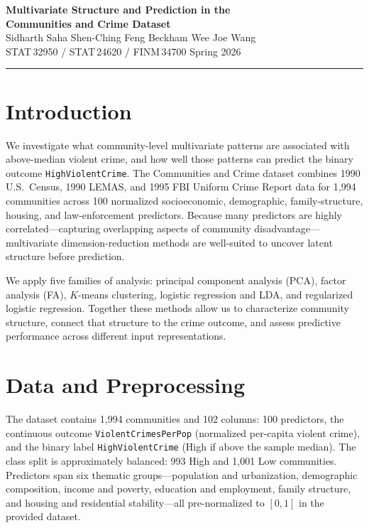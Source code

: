 \documentclass[11pt,letterpaper]{article}
\begin{document}
\begin{center}
  {\large\bfseries Multivariate Structure and Prediction in the\\[2pt]
   Communities and Crime Dataset}\\[8pt]
  Sidharth Saha \quad Shen-Ching Feng \quad Beckham Wee \quad Joe Wang\\[3pt]
  {\small STAT\,32950 / STAT\,24620 / FINM\,34700 \quad Spring 2026}
\end{center}
\vspace{2pt}\hrule\vspace{8pt}

\section{Introduction}

We investigate what community-level multivariate patterns are associated with above-median violent crime, and how well those patterns can predict the binary outcome \texttt{HighViolentCrime}. The Communities and Crime dataset combines 1990 U.S.\ Census, 1990 LEMAS, and 1995 FBI Uniform Crime Report data for 1{,}994 communities across 100 normalized socioeconomic, demographic, family-structure, housing, and law-enforcement predictors. Because many predictors are highly correlated—capturing overlapping aspects of community disadvantage—multivariate dimension-reduction methods are well-suited to uncover latent structure before prediction.

We apply five families of analysis: principal component analysis (PCA), factor analysis (FA), $K$-means clustering, logistic regression and LDA, and regularized logistic regression. Together these methods allow us to characterize community structure, connect that structure to the crime outcome, and assess predictive performance across different input representations.

\section{Data and Preprocessing}

The dataset contains 1{,}994 communities and 102 columns: 100 predictors, the continuous outcome \texttt{ViolentCrimesPerPop} (normalized per-capita violent crime), and the binary label \texttt{HighViolentCrime} (High if above the sample median). The class split is approximately balanced: 993 High and 1{,}001 Low communities. Predictors span six thematic groups—population and urbanization, demographic composition, income and poverty, education and employment, family structure, and housing and residential stability—all pre-normalized to $[0,1]$ in the provided dataset.
\end{document}
